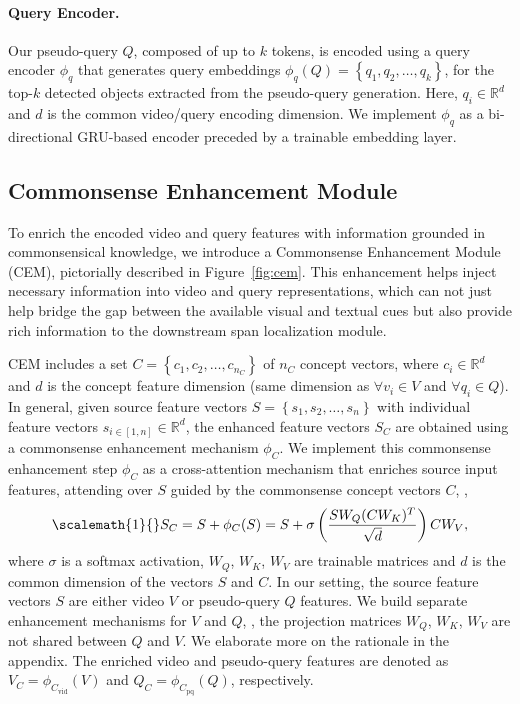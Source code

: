 \paragraph{Query Encoder.}
Our pseudo-query $Q$, composed of up to $k$ tokens, is encoded using a query encoder ${\phi}_{q}$ that generates query embeddings ${\phi}_{q}(Q)\!=\!\left\{ q_{1},q_{2},\ldots,q_{k}\right\}$, for the top-$k$ detected objects extracted from the pseudo-query generation. Here, $q_{i}\in \mathbb{R}^{d}$ and $d$ is the common video/query encoding dimension. We implement ${\phi}_{q}$ as a bi-directional GRU-based encoder preceded by a trainable embedding layer. 

\subsection{Commonsense Enhancement Module}
\label{sec:cem}
To enrich the encoded video and query features with information grounded in commonsensical knowledge, we introduce a Commonsense Enhancement Module (CEM), pictorially described in Figure~\ref{fig:cem}. This enhancement helps inject necessary information into video and query representations, which can not just help bridge the gap between the available visual and textual cues but also provide rich information to the downstream span localization module. 


CEM includes a set \(C\!=\!\left\{c_{1}, c_{2}, \dots, c_{n_{C}}\right\}\) of \(n_{C}\) concept vectors, where \(c_{i} \in \mathbb{R}^{d}\) and \(d\) is the concept feature dimension (same dimension as $\forall v_i \in V$ and $\forall q_i \in Q$). In general, given source feature vectors $S\!=\!\left\{ s_{1},s_{2},\ldots,s_{n}\right\}$ with individual feature vectors $s_{i \in [1,n]} \in \mathbb{R}^{d}$, the enhanced feature vectors $S_{C}$ are obtained using a commonsense enhancement mechanism $\phi_{C}$.
We implement this commonsense enhancement step $\phi_{C}$ as a cross-attention mechanism that enriches source input features, attending over $S$ guided by the commonsense concept vectors $C$, \ie, 
\begin{equation}
\label{eq:cenhance}
\scalemath{1}{
    }
    S_{C} = S + \phi_{C}(S) = S + \sigma \left( \frac{SW_{Q}(CW_{K})^{T}}{\sqrt{d}} \right) C W_{V},
\end{equation}
where $\sigma$ is a softmax activation, \(W_{Q}\), \(W_{K}\), \(W_{V}\) are trainable matrices and \(d\) is the common dimension of the vectors \(S\) and \(C\). In our setting, the source feature vectors $S$ are either video $V$ or pseudo-query $Q$ features. We build separate enhancement mechanisms for $V$ and $Q$, \ie, the projection matrices \(W_{Q}\), \(W_{K}\), \(W_{V}\) are not shared between $Q$ and $V$. We elaborate more on the rationale in the appendix.
The enriched video and pseudo-query features are denoted as \(V_{C}\!=\!\phi_{C_{\text{vid}}}(V)\) and \(Q_{C}\!=\!\phi_{C_{\text{pq}}}(Q)\), respectively.

